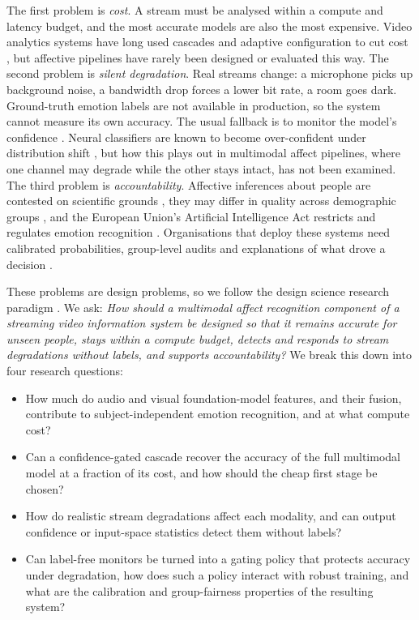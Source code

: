 The first problem is \emph{cost}. A stream must be analysed within a compute and latency budget, and the most accurate models are also the most expensive. Video analytics systems have long used cascades and adaptive configuration to cut cost \citep{kang2017,jiang2018}, but affective pipelines have rarely been designed or evaluated this way. The second problem is \emph{silent degradation}. Real streams change: a microphone picks up background noise, a bandwidth drop forces a lower bit rate, a room goes dark. Ground-truth emotion labels are not available in production, so the system cannot measure its own accuracy. The usual fallback is to monitor the model's confidence \citep{hendrycks2017}. Neural classifiers are known to become over-confident under distribution shift \citep{ovadia2019}, but how this plays out in multimodal affect pipelines, where one channel may degrade while the other stays intact, has not been examined. The third problem is \emph{accountability}. Affective inferences about people are contested on scientific grounds \citep{barrett2019}, they may differ in quality across demographic groups \citep{xu2020,mehrabi2021}, and the European Union's Artificial Intelligence Act restricts and regulates emotion recognition \citep{euaiact2024}. Organisations that deploy these systems need calibrated probabilities, group-level audits and explanations of what drove a decision \citep{rai2020,berente2021}.

These problems are design problems, so we follow the design science research paradigm \citep{hevner2004,peffers2007}. We ask: \emph{How should a multimodal affect recognition component of a streaming video information system be designed so that it remains accurate for unseen people, stays within a compute budget, detects and responds to stream degradations without labels, and supports accountability?} We break this down into four research questions:
\begin{itemize}
\item[\textbf{RQ1}] How much do audio and visual foundation-model features, and their fusion, contribute to subject-independent emotion recognition, and at what compute cost?
\item[\textbf{RQ2}] Can a confidence-gated cascade recover the accuracy of the full multimodal model at a fraction of its cost, and how should the cheap first stage be chosen?
\item[\textbf{RQ3}] How do realistic stream degradations affect each modality, and can output confidence or input-space statistics detect them without labels?
\item[\textbf{RQ4}] Can label-free monitors be turned into a gating policy that protects accuracy under degradation, how does such a policy interact with robust training, and what are the calibration and group-fairness properties of the resulting system?
\end{itemize}


